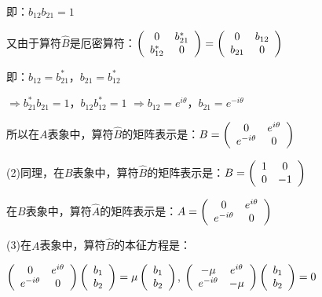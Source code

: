 即：$b_{12} b_{21}  = 1$

又由于算符$\widehat B$是厄密算符：$\left( {\begin{array}{*{20}c}
   0 & {b_{21}^* }  \\
   {b_{12}^* } & 0  \\
\end{array}} \right) = \left( {\begin{array}{*{20}c}
   0 & {b_{12} }  \\
   {b_{21} } & 0  \\
\end{array}} \right)$


即：$b_{12}  = b_{21}^* $，$b_{21}  = b_{12}^* $

$ \Rightarrow b_{21}^* b_{21}  = 1$，$b_{12} b_{12}^*  = 1$ $ \Rightarrow b_{12}  = e^{i\theta } $，$b_{21}  = e^{ - i\theta } $

所以在$A$表象中，算符$\hat B$的矩阵表示是：$B = \left( {\begin{array}{*{20}c}
   0 & {e^{i\theta } }  \\
   {e^{ - i\theta } } & 0  \\
\end{array}} \right)$

(2)同理，在$B$表象中，算符$\hat B$的矩阵表示是：$B = \left( {\begin{array}{*{20}c}
   1 & 0  \\
   0 & { - 1}  \\
\end{array}} \right)$

在$B$表象中，算符$\hat A$的矩阵表示是：$A = \left( {\begin{array}{*{20}c}
   0 & {e^{i\theta } }  \\
   {e^{ - i\theta } } & 0  \\
\end{array}} \right)$

(3)在$A$表象中，算符$\hat B$的本征方程是：

$\left( {\begin{array}{*{20}c}
   0 & {e^{i\theta } }  \\
   {e^{ - i\theta } } & 0  \\
\end{array}} \right)\left( {\begin{array}{*{20}c}
   {b_1 }  \\
   {b_2 }  \\
\end{array}} \right) = \mu \left( {\begin{array}{*{20}c}
   {b_1 }  \\
   {b_2 }  \\
\end{array}} \right)$,
$\left( {\begin{array}{*{20}c}
   { - \mu } & {e^{i\theta } }  \\
   {e^{ - i\theta } } & { - \mu }  \\
\end{array}} \right)\left( {\begin{array}{*{20}c}
   {b_1 }  \\
   {b_2 }  \\
\end{array}} \right) = 0$

